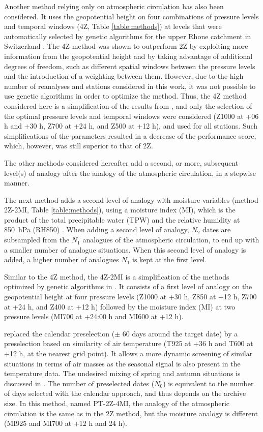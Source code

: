 \documentclass{ametsoc}
\begin{document}
	Another method relying only on atmospheric circulation has also been considered. It uses the geopotential height on four combinations of pressure levels and temporal windows (4Z, Table \ref{table:methods}) at levels that were automatically selected by genetic algorithms for the upper Rhone catchment in Switzerland \citep{Horton2017b}. The 4Z method was shown to outperform 2Z by exploiting more information from the geopotential height and by taking advantage of additional degrees of freedom, such as different spatial windows between the pressure levels and the introduction of a weighting between them. However, due to the high number of reanalyses and stations considered in this work, it was not possible to use genetic algorithms in order to optimize the method. Thus, the 4Z method considered here is a simplification of the results from \citet{Horton2017b}, and only the selection of the optimal pressure levels and temporal windows were considered (Z1000 at +06 h and +30 h, Z700 at +24 h, and Z500 at +12 h), and used for all stations. Such simplifications of the parameters resulted in a decrease of the performance score, which, however, was still superior to that of 2Z.
	
	The other methods considered hereafter add a second, or more, subsequent level(s) of analogy after the analogy of the atmospheric circulation, in a stepwise manner.
	
	The next method adds a second level of analogy with moisture variables (method 2Z-2MI, Table \ref{table:methods}), using a moisture index (MI), which is the product of the total precipitable water (TPW) and the relative humidity at 850~hPa (RH850) \citep{Bontron2004}. When adding a second level of analogy, $N_{2}$ dates are subsampled from the $N_{1}$ analogues of the atmospheric circulation, to end up with a smaller number of analogue situations. When this second level of analogy is added, a higher number of analogues $N_{1}$ is kept at the first level. 
	
	Similar to the 4Z method, the 4Z-2MI is a simplification of the methods optimized by genetic algorithms in \citet{Horton2017b}. It consists of a first level of analogy on the geopotential height at four pressure levels (Z1000 at +30 h, Z850 at +12 h, Z700 at +24 h, and Z400 at +12 h) followed by the moisture index (MI) at two pressure levels (MI700 at +24:00 h and MI600 at +12 h).
	
	\citet{BenDaoud2016} replaced the calendar preselection ($\pm$ 60 days around the target date) by a preselection based on similarity of air temperature (T925 at +36 h and T600 at +12 h, at the nearest grid point). It allows a more dynamic screening of similar situations in terms of air masses as the seasonal signal is also present in the temperature data. The undesired mixing of spring and autumn situations is discussed in \citet{Caillouet2016}. The number of preselected dates ($N_{0}$) is equivalent to the number of days selected with the calendar approach, and thus depends on the archive size. In this method, named PT-2Z-4MI, the analogy of the atmospheric circulation is the same as in the 2Z method, but the moisture analogy is different (MI925 and MI700 at +12 h and 24 h).
	
\end{document}
